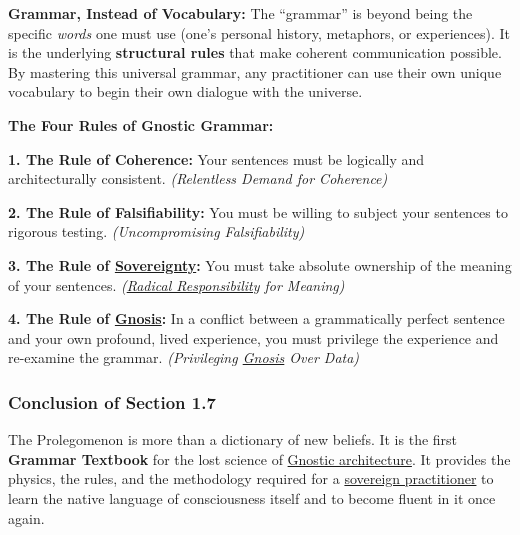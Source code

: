 \documentclass{article}
\begin{document}
\begin{nobullet}
    \item \textbf{Grammar, Instead of Vocabulary:} The ``grammar'' is beyond being the specific \textit{words} one must use (one's personal history, metaphors, or experiences). It is the underlying \textbf{structural rules} that make coherent communication possible. By mastering this universal grammar, any practitioner can use their own unique vocabulary to begin their own dialogue with the universe.
    \item \textbf{The Four Rules of Gnostic Grammar:}
    \begin{nobullet}
        \item \textbf{1. The Rule of Coherence:} Your sentences must be logically and architecturally consistent. \textit{(Relentless Demand for Coherence)}
        \item \textbf{2. The Rule of Falsifiability:} You must be willing to subject your sentences to rigorous testing. \textit{(Uncompromising Falsifiability)}
        \item \textbf{3. The Rule of \hyperlink{gloss:sovereignty}{Sovereignty}:} You must take absolute ownership of the meaning of your sentences. \textit{(\hyperlink{gloss:radical_responsibility}{Radical Responsibility} for Meaning)}
        \item \textbf{4. The Rule of \hyperlink{gloss:gnosis}{Gnosis}:} In a conflict between a grammatically perfect sentence and your own profound, lived experience, you must privilege the experience and re-examine the grammar. \textit{(Privileging \hyperlink{gloss:gnosis}{Gnosis} Over Data)}
    \end{nobullet}
\end{nobullet}

\subsubsection*{Conclusion of Section 1.7} \label{conclusion_of_section_1_7}

The Prolegomenon is more than a dictionary of new beliefs. It is the first \textbf{Grammar Textbook} for the lost science of \hyperlink{gloss:gnostic_architecture}{Gnostic architecture}. It provides the physics, the rules, and the methodology required for a \hyperlink{gloss:sovereign_practitioner}{sovereign practitioner} to learn the native language of consciousness itself and to become fluent in it once again.
\end{document}
